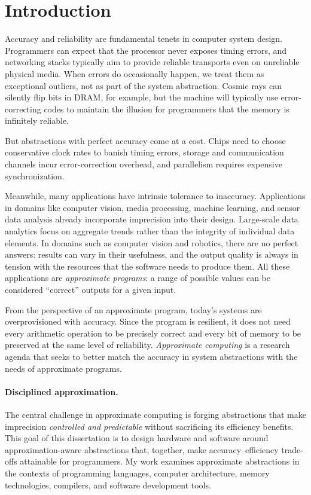 \section{Introduction}
\label{sec:intro}

Accuracy and reliability are fundamental tenets in computer system design.
Programmers can expect that the processor never exposes timing
errors, and networking stacks typically aim to provide reliable transports
even on unreliable physical media.
When errors do occasionally happen, we treat them as exceptional outliers, not
as part of the system abstraction.
Cosmic rays can silently flip bits in DRAM, for example,
but the machine will typically use error-correcting codes to
maintain the illusion for programmers that the memory is infinitely reliable.

But abstractions with perfect accuracy come at a cost.
Chips need to choose conservative clock rates to banish timing errors,
storage and communication channels incur error-correction overhead,
and parallelism requires expensive synchronization.

Meanwhile, many applications have intrinsic tolerance to inaccuracy.
Applications in domains like computer vision, media
processing, machine learning, and sensor data analysis already incorporate
imprecision into their design.
Large-scale data analytics focus on aggregate trends rather than the integrity
of individual data elements.
In domains such as computer vision and robotics, there are no perfect answers:
results can vary in their usefulness, and the output quality is always in
tension with the resources that the software needs to produce them.
All these applications are \emph{approximate
programs}: a range of possible values can be considered ``correct'' outputs
for a given input.

From the perspective of an approximate program, today's
systems are overprovisioned with accuracy. Since the program is resilient, it
does
not need every arithmetic operation to be precisely correct and every bit of
memory to be preserved at the same level of reliability.
\emph{Approximate computing} is a research agenda that seeks to better match
the accuracy in system abstractions with the needs of approximate
programs.


\paragraph{Disciplined approximation.}

The central challenge in approximate computing is forging abstractions that
make imprecision \emph{controlled and predictable} without sacrificing its
efficiency benefits.
This goal of this dissertation is to design hardware and software around
approximation-aware abstractions that, together, make accuracy--efficiency
trade-offs attainable for programmers.
My work examines approximate abstractions
in the contexts of programming languages, computer architecture,
memory technologies, compilers, and software development
tools.


